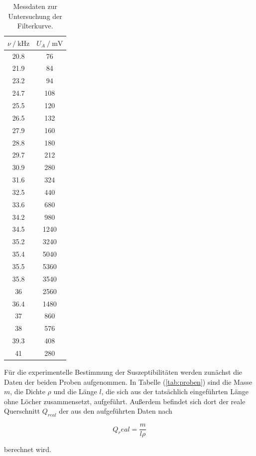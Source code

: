 \begin{table}
\centering
\begin{tabular}{c c}
\toprule
{$\nu \mathbin{/} \si{\kilo\hertz} $} & {$U_A \mathbin{/} \si{\milli\volt}$}  \\
\midrule
20.8  &    76 \\
21.9  &    84 \\
23.2  &    94 \\
24.7  &   108 \\
25.5  &   120 \\
26.5  &   132 \\
27.9  &   160 \\
28.8  &   180 \\
29.7  &   212 \\
30.9  &   280 \\
31.6  &   324 \\
32.5  &   440 \\
33.6  &   680 \\
34.2  &   980 \\
34.5  &  1240 \\
35.2  &  3240 \\
35.4  &  5040 \\
35.5  &  5360 \\
35.8  &  3540 \\
36    &  2560 \\
36.4  &  1480 \\
37    &   860 \\
38    &   576 \\
39.3  &   408 \\
41    &   280 \\
\bottomrule
\end{tabular}
\caption{Messdaten zur Untersuchung der Filterkurve.}
\label{tab:selektiv}
\end{table}

\newpage
\noindent
Für die experimentelle Bestimmung der Suszeptibilitäten werden zunächst die Daten der beiden Proben aufgenommen.
In Tabelle (\ref{tab:proben}) sind die Masse $m$, die Dichte $\rho$ und die Länge $l$, 
die sich aus der tatsächlich eingeführten Länge ohne Löcher zusammensetzt, aufgeführt.
Außerdem befindet sich dort der reale Querschnitt $Q_{real}$ 
der aus den aufgeführten Daten nach 

\begin{equation}
Q_real = \frac{m}{l\rho}
\end{equation}

\noindent
berechnet wird.

